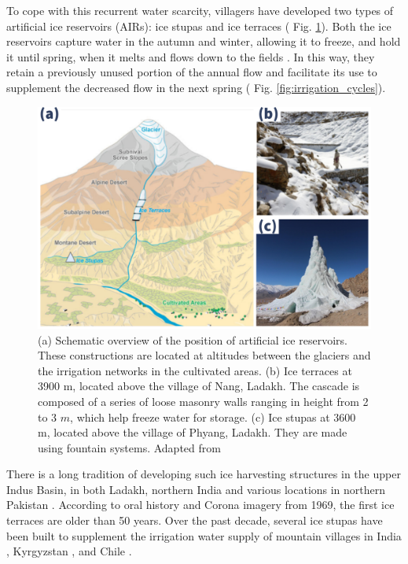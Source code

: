 To cope with this recurrent water scarcity, villagers have developed two types of artificial ice reservoirs
(AIRs): ice stupas and ice terraces ( Fig. \ref{fig:AIRforms}). Both the ice reservoirs capture water in the
autumn and winter, allowing it to freeze, and hold it until spring, when it melts and flows down to the fields
\citep{ipccChapterHighMountain2019, vinceGlacierMan2009, clouseLadakhArtificialGlaciers2017,
nusserSociohydrologyArtificialGlaciers2019}. In this way, they retain a previously unused portion of the annual
flow and facilitate its use to supplement the decreased flow in the next spring ( Fig.
\ref{fig:irrigation_cycles}).

\begin{figure}[t]
\centering
\includegraphics[width=12cm]{figs/AIR_forms.jpg}

\caption{(a) Schematic overview of the position of artificial ice reservoirs. These constructions are located at
  altitudes between the glaciers and the irrigation networks in the cultivated areas. (b) Ice terraces at 3900
  m, located above the village of Nang, Ladakh. The cascade is composed of a series of loose masonry walls
  ranging in height from 2 to 3 $m$, which help freeze water for storage. (c) Ice stupas at 3600 m, located
above the village of Phyang, Ladakh. They are made using fountain systems. Adapted from
\cite{nusserLocalKnowledgeGlobal2016}}

\label{fig:AIRforms}
\end{figure}

There is a long tradition of developing such ice harvesting structures in the upper Indus Basin, in both Ladakh,
northern India \citep{labbalTraditionalOasesLadakh2000, nusserIrrigationDevelopmentUpper2012} and various
locations in northern Pakistan \citep{kreutzmannScarcityOpulenceWater2011}. According to oral history and Corona
imagery from 1969, the first ice terraces are older than 50 years. Over the past decade, several ice stupas have been built to supplement the irrigation water supply of mountain
villages in India \citep{wangchukIceStupaCompetition2020, palmerStoringFrozenWater2022,
aggarwalAdaptationClimateChange2021}, Kyrgyzstan \citep{bbcnewsBrightArtificialGlacier2020}, and Chile
\citep{reutersConservationistsChileAim2021}.



